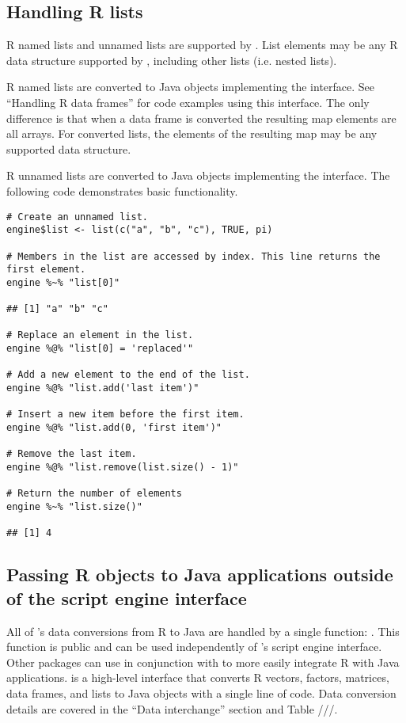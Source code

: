 \subsection{Handling R lists}

R named lists and unnamed lists are supported by . List elements may be any R data structure supported by , including other lists (i.e. nested lists).

R named lists are converted to Java objects implementing the \href{https://docs.oracle.com/javase/8/docs/api/java/util/Map.html}{} interface. See “Handling R data frames” for code examples using this interface. The only difference is that when a data frame is converted the resulting map elements are all arrays. For converted lists, the elements of the resulting map may be any supported data structure.

R unnamed lists are converted to Java objects implementing the \href{https://docs.oracle.com/javase/8/docs/api/java/util/ArrayList.html}{} interface. The following code demonstrates basic  functionality.

\begin{verbatim}
# Create an unnamed list.
engine$list <- list(c("a", "b", "c"), TRUE, pi)

# Members in the list are accessed by index. This line returns the first element.
engine %~% "list[0]"

## [1] "a" "b" "c"

# Replace an element in the list.
engine %@% "list[0] = 'replaced'"

# Add a new element to the end of the list.
engine %@% "list.add('last item')"

# Insert a new item before the first item.
engine %@% "list.add(0, 'first item')"

# Remove the last item.
engine %@% "list.remove(list.size() - 1)"

# Return the number of elements
engine %~% "list.size()"

## [1] 4
\end{verbatim}

\subsection{Passing R objects to Java applications outside of the script engine interface}

All of 's data conversions from R to Java are handled by a single function: . This function is public and can be used independently of 's script engine interface. Other packages can use  in conjunction with  to more easily integrate R with Java applications.  is a high-level interface that converts R vectors, factors, matrices, data frames, and lists to Java objects with a single line of code. Data conversion details are covered in the “Data interchange” section and Table ///.

